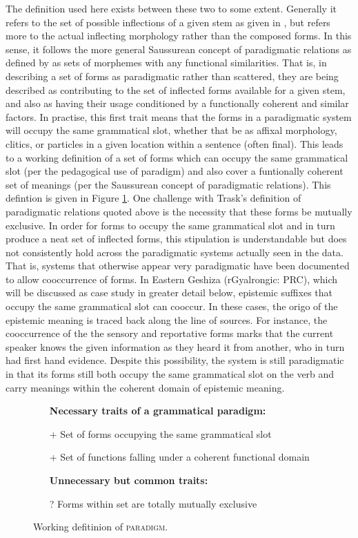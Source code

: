 The definition used here exists between these two to some extent. Generally it refers to the set of possible inflections of a given stem as given in , but refers more to the actual inflecting morphology rather than the composed forms. In this sense, it follows the more general Saussurean concept of paradigmatic relations as defined by  as sets of morphemes with any functional similarities. That is, in describing a set of forms as paradigmatic rather than scattered, they are being described as contributing to the set of inflected forms available for a given stem, and also as having their usage conditioned by a functionally coherent and similar factors. In practise, this first trait means that the forms in a paradigmatic system will occupy the same grammatical slot, whether that be as affixal morphology, clitics, or particles in a given location within a sentence (often final). This leads to a working definition of a set of forms which can occupy the same grammatical slot (per the pedagogical use of paradigm) and also cover a funtionally coherent set of meanings (per the Saussurean concept of paradigmatic relations). This defintion is given in Figure \ref{f:Discussion:Paradigm}. One challenge with Trask's definition of paradigmatic relations quoted above is the necessity that these forms be mutually exclusive. In order for forms to occupy the same grammatical slot and in turn produce a neat set of inflected forms, this stipulation is understandable but does not consistently hold across the paradigmatic systems actually seen in the data. That is, systems that otherwise appear very paradigmatic have been documented to allow cooccurrence of forms. In Eastern Geshiza (rGyalrongic: PRC), which will be discussed as case study in greater detail below, epistemic suffixes that occupy the same grammatical slot can cooccur. In these cases, the origo of the epistemic meaning is traced back along the line of sources. For instance, the cooccurrence of the the sensory and reportative forms marks that the current speaker knows the given information as they heard it from another, who in turn had first hand evidence. Despite this possibility, the system is still paradigmatic in that its forms still both occupy the same grammatical slot on the verb and carry meanings within the coherent domain of epistemic meaning.

\begin{figure}
    \begin{itemize}
        \item[] \textbf{Necessary traits of a grammatical paradigm:}
        \item[+] Set of forms occupying the same grammatical slot
        \item[+] Set of functions falling under a coherent functional domain
        \item[] \textbf{Unnecessary but common traits:}
        \item[?] Forms within set are totally mutually exclusive
    \end{itemize}
    \caption{Working defitinion of \textsc{paradigm}.}\label{f:Discussion:Paradigm}
\end{figure}

